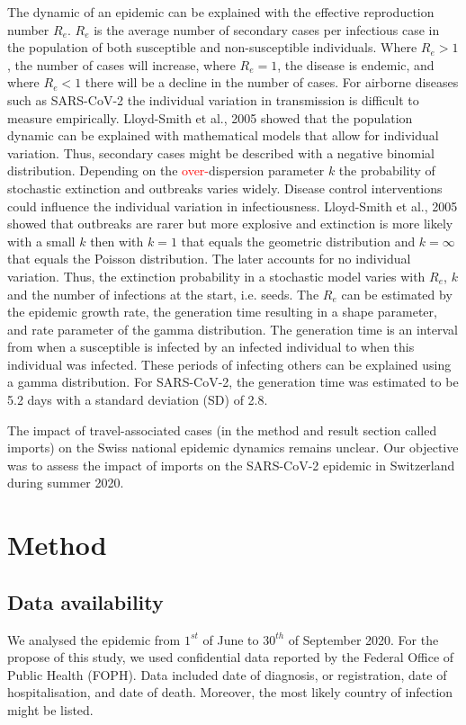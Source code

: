 \documentclass[10pt, a4paper, twoside]{article}
\begin{document}
\begin{multicols}{2}
The dynamic of an epidemic can be explained with the effective reproduction number $R_e$. 
$R_e$ is the average number of secondary cases per infectious case in the population of both susceptible and non-susceptible individuals. 
Where $R_e > 1$ , the number of cases will increase, where $R_e = 1$, the disease is endemic, and where $R_e < 1$ there will be a decline in the number of cases. 
For airborne diseases such as SARS-CoV-2 the individual variation in transmission is difficult to measure empirically. 
Lloyd-Smith et al., 2005 showed that the population dynamic can be explained with mathematical models that allow for individual variation.\cite{lloyd-smith_superspreading_2005}  
Thus, secondary cases might be described with a negative binomial distribution. Depending on the \textcolor{red}{over-}dispersion parameter $k$ the probability of stochastic extinction and outbreaks varies widely. 
Disease control interventions could influence the individual variation in infectiousness.\cite{lloyd-smith_superspreading_2005} 
Lloyd-Smith et al., 2005 showed that outbreaks are rarer but more explosive and extinction is more likely with a small $k$ then with $k = 1$ that equals the geometric distribution and $k = \infty$ that equals the Poisson distribution.\cite{lloyd-smith_superspreading_2005} 
The later accounts for no individual variation. 
Thus, the extinction probability in a stochastic model varies with $R_e$, $k$ and the number of infections at the start, i.e. seeds. 
The $R_e$ can be estimated by the epidemic growth rate, the generation time resulting in a shape parameter, and rate parameter of the gamma distribution. 
The generation time is an interval from when a susceptible is infected by an infected individual to when this individual was infected. 
These periods of infecting others can be explained using a gamma distribution. 
For SARS-CoV-2, the generation time was estimated to be 5.2 days with a standard deviation (SD) of 2.8.\cite{ganyani_estimating_2020}

The impact of travel-associated cases (in the method and result section called imports) on the Swiss national epidemic dynamics remains unclear.
Our objective was to assess the impact of imports on the SARS-CoV-2 epidemic in Switzerland during summer 2020.

\section{Method}

\subsection{Data availability}
We analysed the epidemic from $1^{st}$ of June to $30^{th}$ of September 2020. 
For the propose of this study, we used confidential data reported by the Federal Office of Public Health (FOPH). 
Data included date of diagnosis, or registration, date of hospitalisation, and date of death. 
Moreover, the most likely country of infection might be listed.


\end{multicols}
\end{document}
